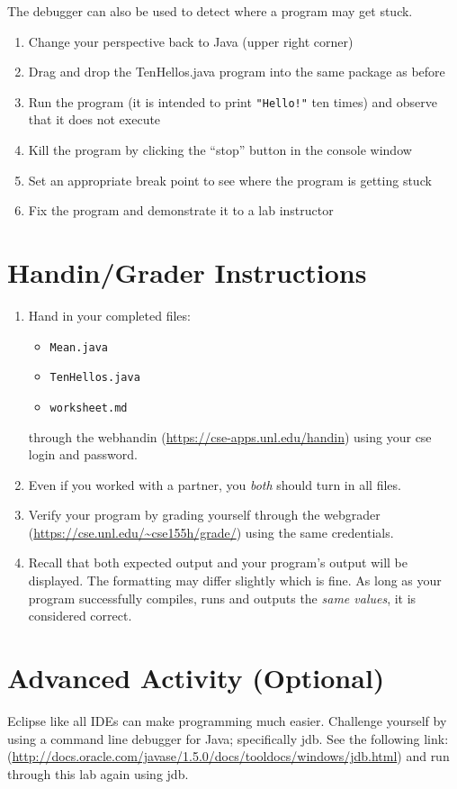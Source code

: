 \documentclass[12pt]{scrartcl}
\begin{document}
The debugger can also be used to detect where a program may get stuck.  
\begin{enumerate}
  \item Change your perspective back to Java (upper right corner)
  \item Drag and drop the TenHellos.java program into the same package as before
  \item Run the program (it is intended to print \texttt{"Hello!"} ten times) 
	and observe that it does not execute
  \item Kill the program by clicking the ``stop'' button in the console window
  \item Set an appropriate break point to see where the program is getting stuck
  \item Fix the program and demonstrate it to a lab instructor
\end{enumerate}


\section{Handin/Grader Instructions}

\begin{enumerate}
  \item Hand in your completed files:
    \begin{itemize}
    \item \texttt{Mean.java}
    \item \texttt{TenHellos.java}
    \item \texttt{worksheet.md}
  \end{itemize}
  through the webhandin (\url{https://cse-apps.unl.edu/handin}) 
  using your cse login and password.  
  \item Even if you worked with a partner, you \emph{both} should
  turn in all files.
  \item Verify your program by grading yourself through the
  webgrader (\url{https://cse.unl.edu/~cse155h/grade/}) using the
  same credentials.
  \item Recall that both expected output and your program's output
  will be displayed.  The formatting may differ slightly which is fine.
  As long as your program successfully compiles, runs and outputs 
  the \emph{same values}, it is considered correct.
\end{enumerate}


\section{Advanced Activity (Optional)}

Eclipse like all IDEs can make programming much easier.  Challenge yourself 
by using a command line debugger for Java; specifically jdb.  See the following 
link: (\url{http://docs.oracle.com/javase/1.5.0/docs/tooldocs/windows/jdb.html}) 
and run through this lab again using jdb.
\end{document}
